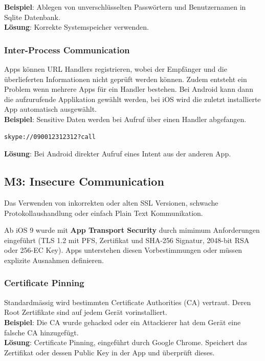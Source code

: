 \textbf{Beispiel}: Ablegen von unverschlüsselten Passwörtern und Benutzernamen in Sqlite Datenbank.\\

\textbf{Lösung}: Korrekte Systemspeicher verwenden.

\subsubsection{Inter-Process Communication}
Apps können URL Handlers registrieren, wobei der Empfänger und die überlieferten Informationen nicht geprüft werden können. Zudem entsteht ein Problem wenn mehrere Apps für ein Handler bestehen. Bei Android kann dann die aufzurufende Applikation gewählt werden, bei iOS wird die zuletzt installierte App automatisch ausgewählt.\\

\textbf{Beispiel}: Sensitive Daten werden bei Aufruf über einen Handler abgefangen.
\begin{lstlisting}[language=XML, caption=Aufruf von Skype]
skype://090012312312?call
\end{lstlisting}

\textbf{Lösung}: Bei Android direkter Aufruf eines Intent aus der anderen App.

\subsection{M3: Insecure Communication}
Das Verwenden von inkorrekten oder alten SSL Versionen, schwache Protokollaushandlung oder einfach Plain Text Kommunikation.

Ab iOS 9 wurde mit \textbf{App Transport Security} durch mimimum Anforderungen eingeführt (TLS 1.2 mit PFS, Zertifikat und SHA-256 Signatur, 2048-bit RSA oder 256-EC Key). Apps unterstehen diesen Vorbestimmungen oder müssen explizite Ausnahmen definieren.

\subsubsection{Certificate Pinning}
Standardmässig wird bestimmten Certificate Authorities (CA) vertraut. Deren Root Zertifikate sind auf jedem Gerät vorinstalliert.\\

\textbf{Beispiel}: Die CA wurde gehacked oder ein Attackierer hat dem Gerät eine falsche CA hinzugefügt. \\

\textbf{Lösung}: Certificate Pinning, eingeführt durch Google Chrome. Speichert das Zertifikat oder dessen Public Key in der App und überprüft dieses.

